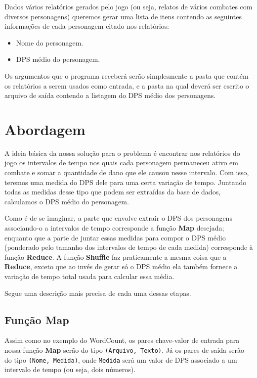 \documentclass[a4paper,11pt]{article}
\begin{document}
  Dados vários relatórios gerados pelo jogo (ou seja, relatos de vários combates
  com diversos personagens) queremos gerar uma lista de itens contendo as
  seguintes informações de cada personagem citado nos relatórios:
  
  \begin{itemize}
  
    \item Nome do personagem.
    \item DPS médio do personagem.
  
  \end{itemize}
  
  Os argumentos que o programa receberá serão simplesmente a pasta que contém os
  relatórios a serem usados como entrada, e a pasta na qual deverá ser escrito o
  arquivo de saída contendo a listagem do DPS médio dos personagens.

\section{Abordagem}

  A ideia básica da nossa solução para o problema é encontrar nos relatórios do
  jogo os intervalos de tempo nos quais cada personagem permaneceu ativo em
  combate e somar a quantidade de dano que ele causou nesse intervalo. Com isso,
  teremos uma medida do DPS dele para uma certa variação de tempo. Juntando
  todas as medidas desse tipo que podem ser extraídas da base de dados,
  calculamos o DPS médio do personagem.
  
  Como é de se imaginar, a parte que envolve extrair o DPS dos personagens
  associando-o a intervalos de tempo corresponde a função \textbf{Map} desejada;
  enquanto que a parte de juntar essas medidas para compor o DPS médio
  (ponderado pelo tamanho dos intervalos de tempo de cada medida) corresponde à
  função \textbf{Reduce}. A função \textbf{Shuffle} faz praticamente a mesma
  coisa que a \textbf{Reduce}, exceto que ao invés de gerar só o DPS médio ela
  também fornece a variação de tempo total usada para calcular essa média.
  
  Segue uma descrição mais precisa de cada uma dessas etapas.
  
  \subsection{Função \textbf{Map}}
  
    Assim como no exemplo do WordCount, os pares chave-valor de entrada para
    nossa função \textbf{Map} serão do tipo \verb$(Arquivo, Texto)$. Já os
    pares de saída serão do tipo \verb$(Nome, Medida)$, onde \verb$Medida$ será
    um valor de DPS associado a um intervalo de tempo (ou seja, dois números).
    
\end{document}
